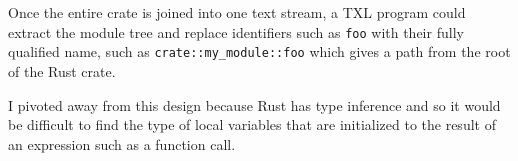 \documentclass[11pt]{article}
\begin{document}
Once the entire crate is joined into one text stream, a TXL program could extract the module tree and replace identifiers such as \lstinline{foo} with their fully qualified name, such as \lstinline{crate::my_module::foo} which gives a path from the root of the Rust crate.

I pivoted away from this design because Rust has type inference and so it would be difficult to find the type of local variables that are initialized to the result of an expression such as a function call.






\end{document}
